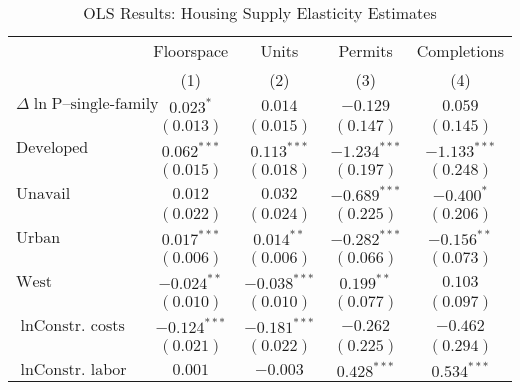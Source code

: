 
\begin{table}
\caption{OLS Results: Housing Supply Elasticity Estimates}
\begin{center}
\begin{footnotesize}
\begin{threeparttable}
\begin{tabular}{l c c c c}
\toprule
 & \multicolumn{1}{c}{Floorspace} & \multicolumn{1}{c}{Units} & \multicolumn{1}{c}{Permits} & \multicolumn{1}{c}{Completions} \\
\cmidrule(lr){2-2} \cmidrule(lr){3-3} \cmidrule(lr){4-4} \cmidrule(lr){5-5}
 & (1) & (2) & (3) & (4) \\
\midrule
$\Delta\ln{\text{P--single-family}}$ & $0.023^{*}$    & $0.014$        & $-0.129$       & $0.059$        \\
                                     & $(0.013)$      & $(0.015)$      & $(0.147)$      & $(0.145)$      \\
$\text{Developed}$                   & $0.062^{***}$  & $0.113^{***}$  & $-1.234^{***}$ & $-1.133^{***}$ \\
                                     & $(0.015)$      & $(0.018)$      & $(0.197)$      & $(0.248)$      \\
$\text{Unavail}$                     & $0.012$        & $0.032$        & $-0.689^{***}$ & $-0.400^{*}$   \\
                                     & $(0.022)$      & $(0.024)$      & $(0.225)$      & $(0.206)$      \\
$\text{Urban}$                       & $0.017^{***}$  & $0.014^{**}$   & $-0.282^{***}$ & $-0.156^{**}$  \\
                                     & $(0.006)$      & $(0.006)$      & $(0.066)$      & $(0.073)$      \\
$\text{West}$                        & $-0.024^{**}$  & $-0.038^{***}$ & $0.199^{**}$   & $0.103$        \\
                                     & $(0.010)$      & $(0.010)$      & $(0.077)$      & $(0.097)$      \\
$\ln{\text{Constr. costs}}$          & $-0.124^{***}$ & $-0.181^{***}$ & $-0.262$       & $-0.462$       \\
                                     & $(0.021)$      & $(0.022)$      & $(0.225)$      & $(0.294)$      \\
$\ln{\text{Constr. labor}}$          & $0.001$        & $-0.003$       & $0.428^{***}$  & $0.534^{***}$  \\

\end{tabular}
\end{threeparttable}
\end{footnotesize}
\end{center}
\end{table}
